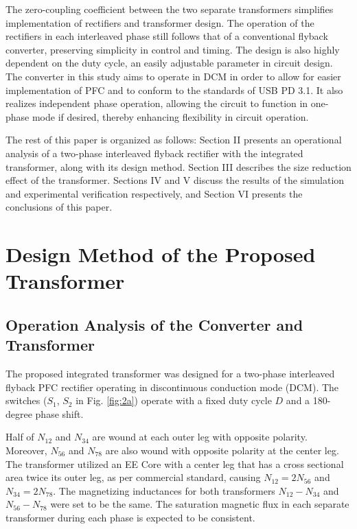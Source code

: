 \documentclass[lettersize,journal]{IEEEtran}
\begin{document}
The zero-coupling coefficient between the two separate transformers simplifies implementation of rectifiers and transformer design. The operation of the rectifiers in each interleaved phase still follows that of a conventional flyback converter, preserving simplicity in control and timing. The design is also highly dependent on the duty cycle, an easily adjustable parameter in circuit design. The converter in this study aims to operate in DCM in order to allow for easier implementation of PFC and to conform to the standards of USB PD 3.1. It also realizes independent phase operation, allowing the circuit to function in one-phase mode if desired, thereby enhancing flexibility in circuit operation.

The rest of this paper is organized as follows: Section II presents an operational analysis of a two-phase interleaved flyback rectifier with the integrated transformer, along with its design method. Section III describes the size reduction effect of the transformer. Sections IV and V discuss the results of the simulation and experimental verification respectively, and Section VI presents the conclusions of this paper.

\section{Design Method of the Proposed Transformer}

\subsection{Operation Analysis of the Converter and Transformer}
The proposed integrated transformer was designed for a two-phase interleaved flyback PFC rectifier operating in discontinuous conduction mode (DCM). The switches ($S_1$, $S_2$ in Fig. \ref{fig:2a}) operate with a fixed duty cycle $D$ and a 180-degree phase shift.

Half of $N_{12}$ and $N_{34}$ are wound at each outer leg with opposite polarity. Moreover, $N_{56}$ and $N_{78}$ are also wound with opposite polarity at the center leg. The transformer utilized an EE Core with a center leg that has a cross sectional area twice its outer leg, as per commercial standard, causing $N_{12}=2N_{56}$ and $N_{34}=2N_{78}$. The magnetizing inductances for both transformers $N_{12}-N_{34}$ and $N_{56}-N_{78}$ were set to be the same. The saturation magnetic flux in each separate transformer during each phase is expected to be consistent.
\end{document}

